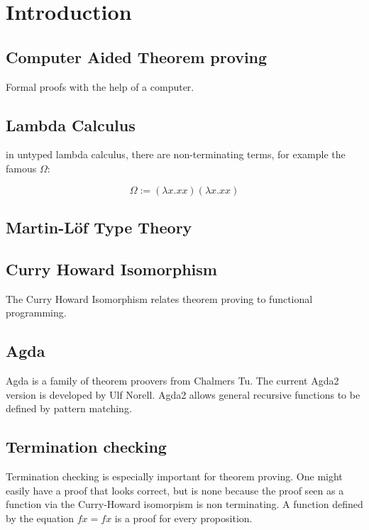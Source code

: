 \chapter{Introduction}
\section {Computer Aided Theorem proving}
Formal proofs with the help of a computer.
\section{Lambda Calculus}

in untyped lambda calculus, there are non-terminating terms, for example the famous \( \Omega \):

\[ \Omega := (\lambda x . x x) (\lambda x . x x) \]


\section{Martin-L\"of Type Theory}
\section {Curry Howard Isomorphism}
The Curry Howard Isomorphism relates theorem proving to functional programming.
\section{Agda}

Agda is a family of theorem proovers from Chalmers Tu.
The current Agda2 version is developed by Ulf Norell.
Agda2 allows general recursive functions to be defined by pattern matching.

\section {Termination checking}
Termination checking is especially important for theorem proving.
One might easily have a proof that looks correct, but is none because the proof seen as a function
via the Curry-Howard isomorpism is non terminating.
A function defined by the equation $ f x = f x $ is a proof for every proposition.

